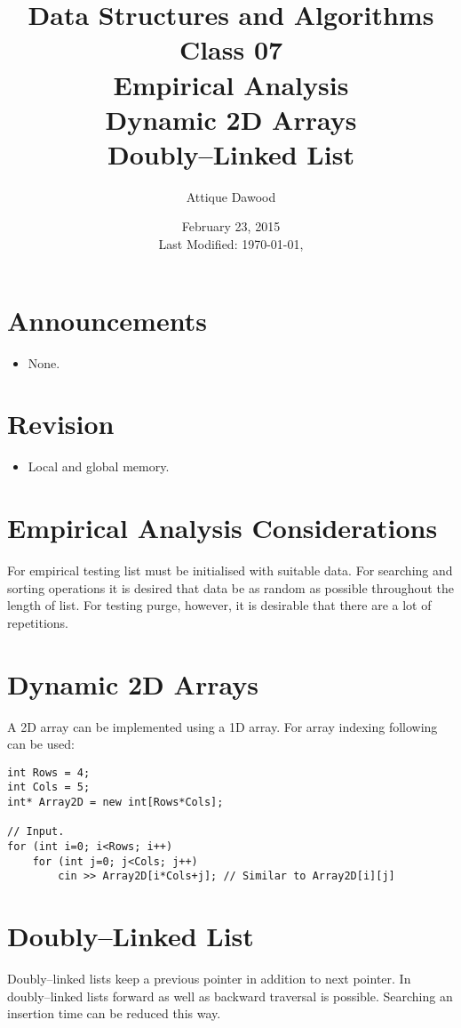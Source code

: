 \documentclass[12pt,a4paper]{article}
\title{Data Structures and Algorithms\\Class 07\\Empirical Analysis\\Dynamic 2D Arrays\\Doubly--Linked List}
\author{Attique Dawood}
\date{February 23, 2015\\[0.2cm] Last Modified: \today, \currenttime}
\begin{document}
\maketitle
\section{Announcements}
\begin{itemize}
\item None.
\end{itemize}
\section{Revision}
\begin{itemize}
\item Local and global memory.
\end{itemize}
\section{Empirical Analysis Considerations}
For empirical testing list must be initialised with suitable data. For searching and sorting operations it is desired that data be as random as possible throughout the length of list. For testing purge, however, it is desirable that there are a lot of repetitions.
\section{Dynamic 2D Arrays}
A 2D array can be implemented using a 1D array. For array indexing following can be used:
\begin{lstlisting}
int Rows = 4;
int Cols = 5;
int* Array2D = new int[Rows*Cols];

// Input.
for (int i=0; i<Rows; i++)
    for (int j=0; j<Cols; j++)
        cin >> Array2D[i*Cols+j]; // Similar to Array2D[i][j]
\end{lstlisting}
\section{Doubly--Linked List}
Doubly--linked lists keep a previous pointer in addition to next pointer. In doubly--linked lists forward as well as backward traversal is possible. Searching an insertion time can be reduced this way.


\end{document}

